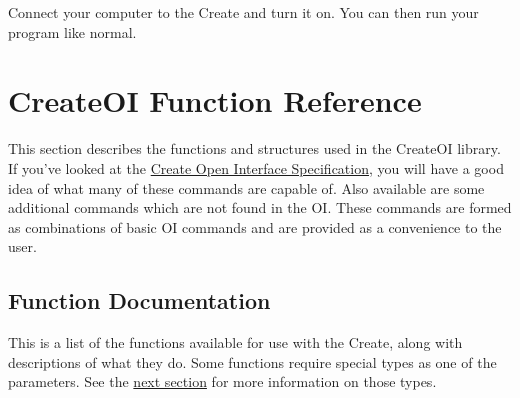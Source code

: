 \documentclass {article}
\begin{document}
\noindent Connect your computer to the Create and turn it on.  You can then run your program like
normal.

\newpage


\section {CreateOI Function Reference}
\newcommand {\lng} {{\bf long\ }}
\newcommand {\short} {{\bf short\ }}
\newcommand {\cint} {{\bf int\ }}
\newcommand {\flt} {{\bf float\ }}
\newcommand {\dbl} {{\bf double\ }}
\newcommand {\cchar} {{\bf char\ }}
\newcommand {\fail} {{\tt INT\_MIN\ }}
%
\newcommand {\byte} {\hyperlink{oibyte}{{\bf byte\ }}}
\newcommand {\oiled} {\hyperlink{oiled}{{\bf oi\_led\ }}}
\newcommand {\oibaud} {\hyperlink{oibaud}{{\bf oi\_baud\ }}}
\newcommand {\oidemo} {\hyperlink{oidemo}{{\bf oi\_demo\ }}}
\newcommand {\oisensor} {\hyperlink{oisensor}{{\bf oi\_sensor\ }}}
\newcommand {\oicommand} {\hyperlink{oicommand}{{\bf oi\_command\ }}}
\newcommand {\oioutput} {\hyperlink{oioutput}{{\bf oi\_output\ }}}
%
\newcommand {\func}[2]{\hypertarget{#2}{{\tt #1}} \\}
\newcommand {\ret}[1] {{\bf Returns:} #1}
\newcommand {\retnorm} {{\bf Returns:} 0 on success or -1 on error}
\newenvironment {params}{{\bf Parameters:} \vspace{-9pt} \begin {quote} \begin {description}}
    {\end {description} \end {quote}}

This section describes the functions and structures used in the CreateOI library.  If you've looked at the
\href{http://www.irobot.com/sp.cfm?pageid=294} {Create Open Interface Specification}, you will
have a good idea of what many of these commands are capable of.  Also available are some additional
commands which are not found in the OI.  These commands are formed as combinations of basic OI
commands and are provided as a convenience to the user.

\subsection{Function Documentation} 
This is a list of the functions available for use with the Create, along with descriptions of what
they do.  Some functions require special types as one of the parameters.  See the
\hyperlink{datatypes}{next section} for more information on those types.
\end{document}
